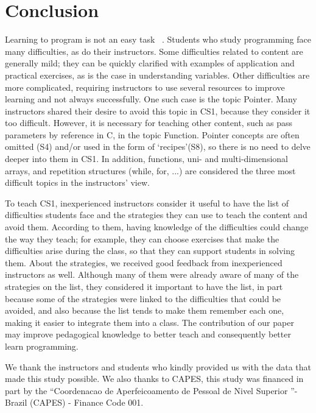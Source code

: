 \documentclass[sigconf]{acmart}
\begin{document}
\section{Conclusion}
Learning to program is not an easy task ~\cite{Lahtinen05}. Students who study programming face many difficulties, as do their instructors. Some difficulties related to content are generally mild; they can be quickly clarified with examples of application and practical exercises, as is the case in understanding variables. Other difficulties are more complicated, requiring instructors to use several resources to improve learning and not always successfully. One such case is the topic Pointer. Many instructors shared their desire to avoid this topic in CS1, because they consider it too difficult. However, it is necessary for teaching other content, such as pass parameters by reference in C, in the topic Function. Pointer concepts are often omitted (S4) and/or used in the form of \textquoteleft{recipes}\textquoteright \space (S8), so there is no need to delve deeper into them in CS1. In addition, functions, uni- and multi-dimensional arrays, and repetition structures (while, for, ...) are considered the three most difficult topics in the instructors' view.

To teach CS1, inexperienced instructors consider it useful to have the list of difficulties students face and the strategies they can use to teach the content and avoid them. According to them, having knowledge of the difficulties could change the way they teach; for example, they can choose exercises that make the difficulties arise during the class, so that they can support students in solving them. About the strategies, we received good feedback from inexperienced instructors as well. Although many of them were already aware of many of the strategies on the list, they considered it important to have the list, in part because some of the strategies were linked to the difficulties that could be avoided, and also because the list tends to make them remember each one, making it easier to integrate them into a class. The contribution of our paper may improve pedagogical knowledge to better teach and consequently better learn programming.

%
\begin{acks}
  We thank the instructors and students who kindly provided us with the data that made this study possible. We also thanks to CAPES, this study was financed in part by the \textquotedblleft {Coordenacao de Aperfeicoamento de Pessoal de Nivel Superior} \textquotedblright \space - Brazil (CAPES) - Finance Code 001.
\end{acks}

%


\end{document}
